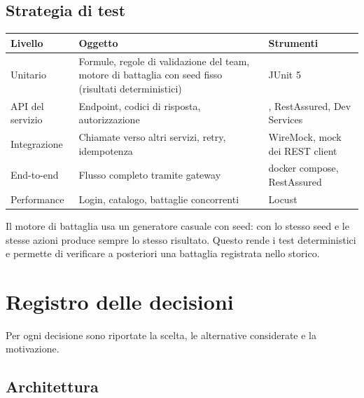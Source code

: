\documentclass[11pt,a4paper]{article}
\begin{document}
\subsection{Strategia di test}

\begin{tabularx}{\linewidth}{@{}L{3.4cm}YL{3.4cm}@{}}
  \toprule
  Livello & Oggetto & Strumenti \\
  \midrule
  Unitario & Formule, regole di validazione del team, motore di battaglia con seed fisso (risultati deterministici) & JUnit 5 \\
  API del servizio & Endpoint, codici di risposta, autorizzazione & , RestAssured, Dev Services \\
  Integrazione & Chiamate verso altri servizi, retry, idempotenza & WireMock, mock dei REST client \\
  End-to-end & Flusso completo tramite gateway & docker compose, RestAssured \\
  Performance & Login, catalogo, battaglie concorrenti & Locust \\
  \bottomrule
\end{tabularx}

Il motore di battaglia usa un generatore casuale con seed: con lo stesso seed e le stesse azioni produce sempre lo stesso risultato. Questo rende i test deterministici e permette di verificare a posteriori una battaglia registrata nello storico.

\section{Registro delle decisioni}\label{sec:decisioni}

Per ogni decisione sono riportate la scelta, le alternative considerate e la motivazione.

\subsection{Architettura}
\end{document}
